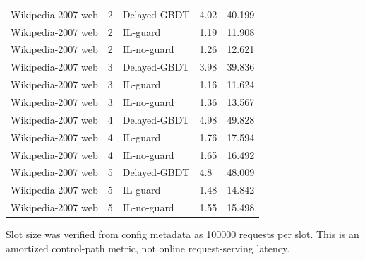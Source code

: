 \begin{table}[t]
\begin{tabular}{lllll}
Wikipedia-2007 web & 2 & Delayed-GBDT & 4.02 & 40.199 \\
Wikipedia-2007 web & 2 & IL-guard & 1.19 & 11.908 \\
Wikipedia-2007 web & 2 & IL-no-guard & 1.26 & 12.621 \\
Wikipedia-2007 web & 3 & Delayed-GBDT & 3.98 & 39.836 \\
Wikipedia-2007 web & 3 & IL-guard & 1.16 & 11.624 \\
Wikipedia-2007 web & 3 & IL-no-guard & 1.36 & 13.567 \\
Wikipedia-2007 web & 4 & Delayed-GBDT & 4.98 & 49.828 \\
Wikipedia-2007 web & 4 & IL-guard & 1.76 & 17.594 \\
Wikipedia-2007 web & 4 & IL-no-guard & 1.65 & 16.492 \\
Wikipedia-2007 web & 5 & Delayed-GBDT & 4.8 & 48.009 \\
Wikipedia-2007 web & 5 & IL-guard & 1.48 & 14.842 \\
Wikipedia-2007 web & 5 & IL-no-guard & 1.55 & 15.498 \\
\bottomrule
\end{tabular}
\vspace{0.4ex}\par\scriptsize{Slot size was verified from config metadata as 100000 requests per slot. This is an amortized control-path metric, not online request-serving latency.}
\end{table}
